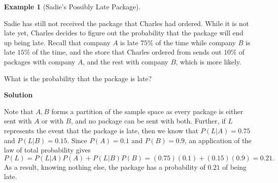\documentclass[
  letterpaper,
  DIV=11,
  numbers=noendperiod]{scrreprt}
\theoremstyle{definition}
\theoremstyle{definition}
\newtheorem{example}{Example}[chapter]
\theoremstyle{definition}
\theoremstyle{remark}
\begin{document}
\begin{example}[Sadie's Possibly Late
Package]\protect\hypertarget{exm-lotp-example}{}\label{exm-lotp-example}

Sadie has still not received the package that Charles had ordered. While
it is not late yet, Charles decides to figure out the probability that
the package will end up being late. Recall that company \(A\) is late
\(75\%\) of the time while company \(B\) is late \(15\%\) of the time,
and the store that Charles ordered from sends out \(10\%\) of packages
with company \(A\), and the rest with company \(B\), which is more
likely.

What is the probability that the package is late?

\begin{tcolorbox}[enhanced jigsaw, colback=white, colframe=quarto-callout-color-frame, arc=.35mm, leftrule=.75mm, rightrule=.15mm, opacityback=0, breakable, bottomrule=.15mm, left=2mm, toprule=.15mm]

\vspace{-3mm}\textbf{Solution}\vspace{3mm}

Note that \(A, B\) forms a partition of the sample space as every
package is either sent with \(A\) or with \(B\), and no package can be
sent with both. Further, if \(L\) represents the event that the package
is late, then we know that \(P(L|A) = 0.75\) and \(P(L|B) = 0.15\).
Since \(P(A) = 0.1\) and \(P(B) = 0.9\), an application of the law of
total probability gives
\[P(L) = P(L|A)P(A) + P(L|B)P(B) = (0.75)(0.1) + (0.15)(0.9) = 0.21.\]
As a result, knowing nothing else, the package has a probability of
\(0.21\) of being late.

\end{tcolorbox}

\end{example}
\end{document}
